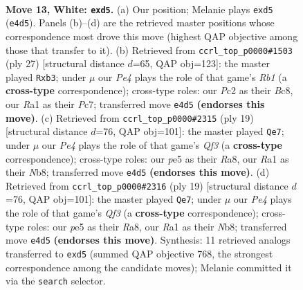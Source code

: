 \documentclass[11pt]{article}
\begin{document}
\clearpage

\begin{figure}[p]\centering
\begin{subfigure}{0.46\textwidth}\centering
\resizebox{\linewidth}{!}{%
\newchessgame
\chessboard[
  setfen={r1bq1rk1/2p2p2/2p2np1/p2pp1Np/4P3/2PP2P1/P1P1QP1P/R1B2RK1 w - - 0 13},
  showmover=false,
  pgfstyle=straightmove, color=movearrow, markmove={e4-d5}
]}
\caption{}
\end{subfigure}\hfill
\begin{subfigure}{0.46\textwidth}\centering
\resizebox{\linewidth}{!}{%
\newchessgame
\chessboard[
  setfen={1rbqr1k1/2pn1ppp/p2p4/P1p1p3/3PP3/1RP2N1P/2P2PP1/2BQR1K1 b - - 1 14},
  showmover=false,
  pgfstyle=straightmove, color=movearrow, markmove={b8-b3}
]}
\caption{}
\end{subfigure}
\\[4pt]
\begin{subfigure}{0.46\textwidth}\centering
\resizebox{\linewidth}{!}{%
\newchessgame
\chessboard[
  setfen={rnb2rk1/pp3pp1/4pq1p/2pp4/2PP2PP/P1P2N2/4PP2/R2QKB1R b KQ - 0 10},
  showmover=false,
  pgfstyle=straightmove, color=movearrow, markmove={f6-e7}
]}
\caption{}
\end{subfigure}\hfill
\begin{subfigure}{0.46\textwidth}\centering
\resizebox{\linewidth}{!}{%
\newchessgame
\chessboard[
  setfen={rnb2rk1/pp3pp1/4pq1p/2pp4/2PP2PP/P1P2N2/4PP2/R2QKB1R b KQ - 0 10},
  showmover=false,
  pgfstyle=straightmove, color=movearrow, markmove={f6-e7}
]}
\caption{}
\end{subfigure}
\caption{\textbf{Move 13, White: \texttt{exd5}.} (a) Our position; Melanie plays \texttt{exd5} (\texttt{e4d5}). Panels (b)--(d) are the retrieved master positions whose correspondence most drove this move (highest QAP objective among those that transfer to it). (b) Retrieved from \texttt{ccrl\_top\_p0000\#1503} (ply 27) [structural distance $d$=65, QAP obj=123]: the master played \texttt{Rxb3}; under $\mu$ our \emph{Pe4} plays the role of that game's \emph{Rb1} (a \textbf{cross-type} correspondence); cross-type roles: our \emph{P}c2 as their \emph{B}c8, our \emph{R}a1 as their \emph{P}c7; transferred move \texttt{e4d5} \textbf{(endorses this move)}. (c) Retrieved from \texttt{ccrl\_top\_p0000\#2315} (ply 19) [structural distance $d$=76, QAP obj=101]: the master played \texttt{Qe7}; under $\mu$ our \emph{Pe4} plays the role of that game's \emph{Qf3} (a \textbf{cross-type} correspondence); cross-type roles: our \emph{p}e5 as their \emph{R}a8, our \emph{R}a1 as their \emph{N}b8; transferred move \texttt{e4d5} \textbf{(endorses this move)}. (d) Retrieved from \texttt{ccrl\_top\_p0000\#2316} (ply 19) [structural distance $d$=76, QAP obj=101]: the master played \texttt{Qe7}; under $\mu$ our \emph{Pe4} plays the role of that game's \emph{Qf3} (a \textbf{cross-type} correspondence); cross-type roles: our \emph{p}e5 as their \emph{R}a8, our \emph{R}a1 as their \emph{N}b8; transferred move \texttt{e4d5} \textbf{(endorses this move)}. Synthesis: 11 retrieved analogs transferred to \texttt{exd5} (summed QAP objective 768, the strongest correspondence among the candidate moves); Melanie committed it via the \texttt{search} selector.}

\end{figure}
\end{document}
